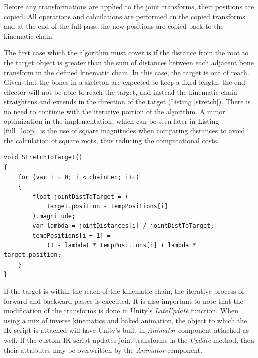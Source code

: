 Before any transformations are applied to the joint transforms, their positions
are copied. All operations and calculations are performed on the copied
transforms and at the end of the full pass, the new positions are copied back to
the kinematic chain.


The first case which the algorithm must cover is if the distance from the root
to the target object is greater than the sum of distances between each adjacent
bone transform in the defined kinematic chain. In this case, the target is out
of reach. Given that the bones in a skeleton are expected to keep a fixed
length, the end effector will not be able to reach the target, and instead the
kinematic chain straightens and extends in the direction of the target (Listing
\ref{stretch}). There is no need to continue with the iterative portion of the
algorithm. A minor optimization in the implementation, which can be seen later
in Listing \ref{full_loop}, is the use of square magnitudes when comparing
distances to avoid the calculation of square roots, thus reducing the
computational costs.

\begin{lstlisting}[basicstyle=\linespread{0.9}\footnotesize\ttfamily, numbers=none,frame=single, caption={Target out of
reach. \textit{Fabrik.cs}},captionpos=t, label=stretch, language={[Sharp]c}]
void StretchToTarget()
{
    for (var i = 0; i < chainLen; i++)
    {
        float jointDistToTarget = (
            target.position - tempPositions[i]
        ).magnitude;
        var lambda = jointDistances[i] / jointDistToTarget;
        tempPositions[i + 1] =
            (1 - lambda) * tempPositions[i] + lambda * target.position;
    }
}
\end{lstlisting}

If the target is within the reach of the kinematic chain, the iterative process
of forward and backward passes is executed. It is also important to note that
the modification of the transforms is done in Unity's \textit{LateUpdate}
function. When using a mix of inverse kinematics and baked animation, the object
to which the IK script is attached will have Unity's built-in \textit{Animator}
component attached as well. If the custom IK script updates joint transforms in
the \textit{Update} method, then their attributes may be overwritten by the
\textit{Animator} component. 


